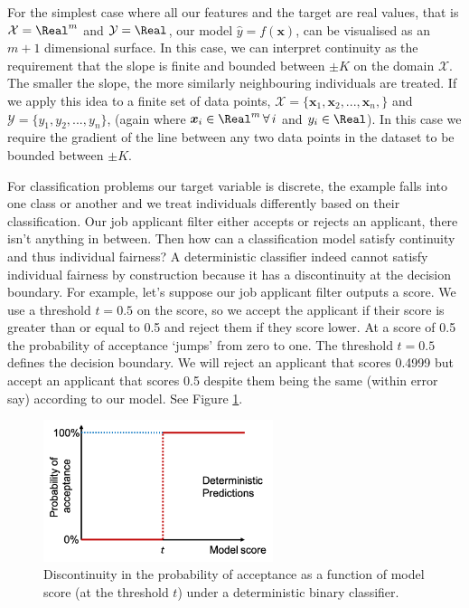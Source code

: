 For the simplest case where all our features and the target are real values, that is $\mathcal{X}=\Real^m$ and $\mathcal{Y}=\Real$, our model $\hat{y}=f(\boldsymbol{x})$, can be visualised as an $m+1$ dimensional surface. In this case, we can interpret continuity as the requirement that the slope is finite and bounded between $\pm K$ on the domain $\mathcal{X}$.  The smaller the slope, the more similarly neighbouring individuals are treated. If we apply this idea to a finite set of data points, $\mathcal{X}=\{\boldsymbol{x}_1,\boldsymbol{x}_2,...,\boldsymbol{x}_n,\}$ and $\mathcal{Y}=\{y_1, y_2,...,y_n\}$, (again where $\boldsymbol{x}_i\in\Real^m\,\forall\, i$ and $y_i\in\Real$). In this case we require the gradient of the line between any two data points in the dataset to be bounded between $\pm K$.

For classification problems our target variable is discrete, the example falls into one class or another and we treat individuals differently based on their classification. Our job applicant filter either accepts or rejects an applicant, there isn't anything in between. Then how can a classification model satisfy continuity and thus individual fairness? A deterministic classifier indeed cannot satisfy individual fairness by construction because it has a discontinuity at the decision boundary. For example, let's suppose our job applicant filter outputs a score. We use a threshold $t=0.5$ on the score, so we accept the applicant if their score is greater than or equal to 0.5 and reject them if they score lower. At a score of 0.5 the probability of acceptance `jumps' from zero to one. The threshold $t=0.5$ defines the decision boundary. We will reject an applicant that scores 0.4999 but accept an applicant that scores 0.5 despite them being the same (within error say) according to our model. See Figure \ref{fig:DiscThreshold}.
%
\begin{figure}[h!]
\centering
\includegraphics[width=0.6\textwidth]{04_IndividualFairness/figures/Fig_Score2ProbDisc.png}
\caption[Discontinuity in the probability of acceptance as a function of model score.]{Discontinuity in the probability of acceptance as a function of model score (at the threshold $t$) under a deterministic binary classifier.}
\label{fig:DiscThreshold}
\end{figure}

